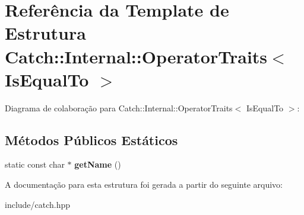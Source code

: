 \hypertarget{structCatch_1_1Internal_1_1OperatorTraits_3_01IsEqualTo_01_4}{}\section{Referência da Template de Estrutura Catch\+:\+:Internal\+:\+:Operator\+Traits$<$ Is\+Equal\+To $>$}
\label{structCatch_1_1Internal_1_1OperatorTraits_3_01IsEqualTo_01_4}


Diagrama de colaboração para Catch\+:\+:Internal\+:\+:Operator\+Traits$<$ Is\+Equal\+To $>$\+:
\subsection*{Métodos Públicos Estáticos}
\begin{DoxyCompactItemize}
\item 
static const char $\ast$ {\bfseries get\+Name} ()\hypertarget{structCatch_1_1Internal_1_1OperatorTraits_3_01IsEqualTo_01_4_addf03ac66f0ed83abcc037a7a327d4f1}{}\label{structCatch_1_1Internal_1_1OperatorTraits_3_01IsEqualTo_01_4_addf03ac66f0ed83abcc037a7a327d4f1}

\end{DoxyCompactItemize}


A documentação para esta estrutura foi gerada a partir do seguinte arquivo\+:\begin{DoxyCompactItemize}
\item 
include/catch.\+hpp\end{DoxyCompactItemize}
